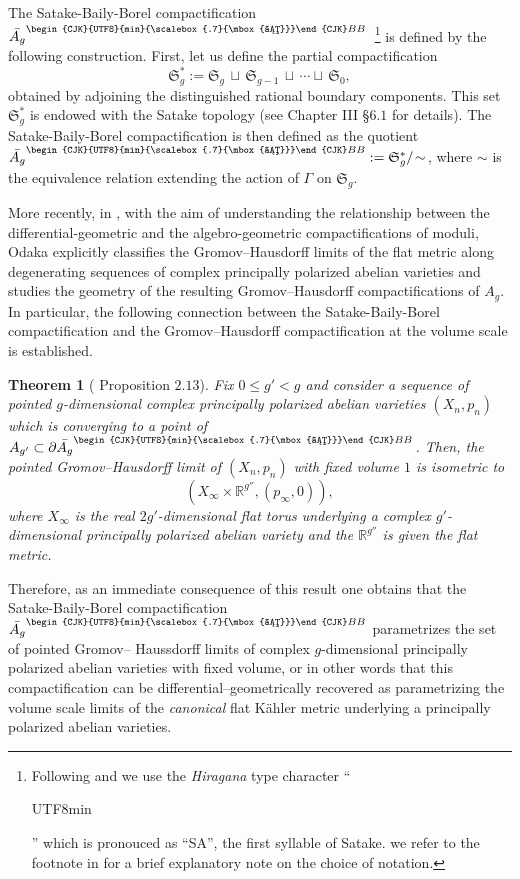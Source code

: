 \documentclass[11pt]{amsart}
\theoremstyle{plain}
\newtheorem{theorem}{Theorem}[section]
\theoremstyle{definition}
\theoremstyle{remark}
\newcommand{\fS}{\mathfrak{S}}
\newcommand{\sbb}{\text{\begin{CJK}{UTF8}{min}{\scalebox{.7}{\mbox{さ}}}\end{CJK}}BB}
\begin{document}
The Satake-Baily-Borel compactification $\bar{A_g}^{\sbb}$ \,\footnote{Following \cite{Odaka2019} and \cite{Namikawa80} we use the \textit{Hiragana} type character ``\begin{CJK}{UTF8}{min}{}\end{CJK}'' which is pronouced as ``SA'', the first syllable of Satake. we refer to the footnote in \cite{Odaka2019} for a brief explanatory note on the choice of notation.} is defined by the following construction. First, let us define the partial compactification
\[
\fS_g^*:=\fS_g\,\sqcup\,\fS_{g-1}\,\sqcup\,\cdots\sqcup\,\fS_0,
\]
obtained by adjoining the distinguished rational boundary components. This set $\fS_g^*$ is endowed with the Satake topology (see  \cite{AMRT} Chapter III \S $6.1$ for details). The Satake-Baily-Borel compactification is then defined as the quotient $ \bar{A_g}^{\sbb}:=\fS_g^*/\!\sim$,
where $\sim$ is the equivalence relation extending the action of $\Gamma$ on $\fS_g$.

More recently, in \cite{Odaka2019}, with the aim of understanding the relationship between the differential-geometric and the algebro-geometric compactifications of moduli, Odaka explicitly classifies the Gromov--Hausdorff limits of the flat metric along degenerating sequences of complex principally polarized abelian varieties and studies the geometry of the resulting Gromov--Hausdorff compactifications of $A_g$. In particular, the following connection between the Satake-Baily-Borel compactification and the Gromov--Hausdorff compactification at the volume scale is established.

\begin{theorem}[\cite{Odaka2019} Proposition $2.13$]
\label{thm:vol.GH.limits.abelian}
Fix $0\leq g'<g$ and consider a sequence of pointed $g$-dimensional complex principally polarized abelian varieties $(X_n,p_n)$ which is converging to a point of $A_{g'} \subset \partial\bar{A_{g}}^{\sbb}$. Then, the pointed Gromov--Hausdorff limit of  $(X_n,p_n)$ with fixed volume $1$ is isometric to 
\[
(X_\infty\times \mathbb{R}^{g''},(p_\infty,0)),
\] 
where $X_\infty$ is the real $2g'$-dimensional flat torus underlying a complex $g'$-dimensional principally polarized abelian variety and the $\mathbb{R}^{g''}$ is given the flat metric. 
\end{theorem}

Therefore, as an immediate consequence of this result one obtains that the Satake-Baily-Borel compactification $\bar{A_g}^{\sbb}$ parametrizes the set of pointed Gromov-- Haussdorﬀ limits of complex $g$-dimensional principally polarized abelian varieties with fixed volume, or in other words that this compactification can be differential--geometrically recovered as parametrizing the volume scale limits of the \emph{canonical} flat K\"ahler metric underlying a principally polarized abelian varieties.
\end{document}
